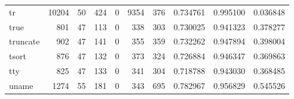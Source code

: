 \begin{tabular}{lrrrrrrrrr}
tr        &                               10204 &                                              50 &                                            424 &                                             0 &                                           9354 &                                          376 &                                           0.734761 &                               0.995100 &                             0.036848 \\
true      &                                 801 &                                              47 &                                            113 &                                             0 &                                            338 &                                          303 &                                           0.730025 &                               0.941323 &                             0.378277 \\
truncate  &                                 902 &                                              47 &                                            141 &                                             0 &                                            355 &                                          359 &                                           0.732262 &                               0.947894 &                             0.398004 \\
tsort     &                                 876 &                                              47 &                                            132 &                                             0 &                                            373 &                                          324 &                                           0.726884 &                               0.946347 &                             0.369863 \\
tty       &                                 825 &                                              47 &                                            133 &                                             0 &                                            341 &                                          304 &                                           0.718788 &                               0.943030 &                             0.368485 \\
uname     &                                1274 &                                              55 &                                            181 &                                             0 &                                            343 &                                          695 &                                           0.782967 &                               0.956829 &                             0.545526 \\

\end{tabular}
